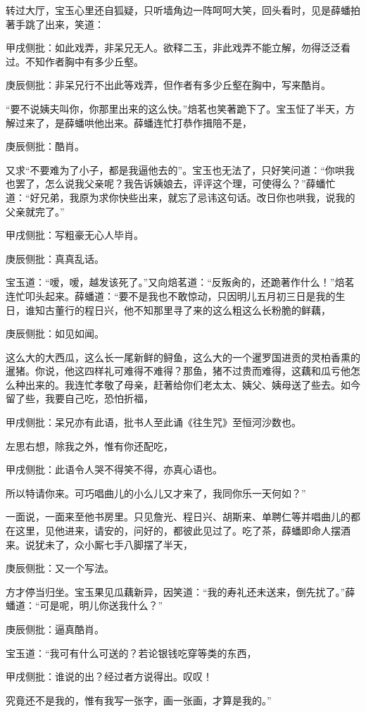 \begin{parag}
    转过大厅，宝玉心里还自狐疑，只听墙角边一阵呵呵大笑，回头看时，见是薛蟠拍著手跳了出来，笑道：\begin{note}甲戌侧批：如此戏弄，非呆兄无人。欲释二玉，非此戏弄不能立解，勿得泛泛看过。不知作者胸中有多少丘壑。\end{note}\begin{note}庚辰侧批：非呆兄行不出此等戏弄，但作者有多少丘壑在胸中，写来酷肖。\end{note}“要不说姨夫叫你，你那里出来的这么快。”焙茗也笑著跪下了。宝玉怔了半天，方解过来了，是薛蟠哄他出来。薛蟠连忙打恭作揖陪不是，\begin{note}庚辰侧批：酷肖。\end{note}又求“不要难为了小子，都是我逼他去的”。宝玉也无法了，只好笑问道：“你哄我也罢了，怎么说我父亲呢？我告诉姨娘去，评评这个理，可使得么？”薛蟠忙道：“好兄弟，我原为求你快些出来，就忘了忌讳这句话。改日你也哄我，说我的父亲就完了。”\begin{note}甲戌侧批：写粗豪无心人毕肖。\end{note}\begin{note}庚辰侧批：真真乱话。\end{note}宝玉道：“嗳，嗳，越发该死了。”又向焙茗道：“反叛肏的，还跪著作什么！”焙茗连忙叩头起来。薛蟠道：“要不是我也不敢惊动，只因明儿五月初三日是我的生日，谁知古董行的程日兴，他不知那里寻了来的这么粗这么长粉脆的鲜藕，\begin{note}庚辰侧批：如见如闻。\end{note}这么大的大西瓜，这么长一尾新鲜的鲟鱼，这么大的一个暹罗国进贡的灵柏香熏的暹猪。你说，他这四样礼可难得不难得？那鱼，猪不过贵而难得，这藕和瓜亏他怎么种出来的。我连忙孝敬了母亲，赶著给你们老太太、姨父、姨母送了些去。如今留了些，我要自己吃，恐怕折福，\begin{note}甲戌侧批：呆兄亦有此语，批书人至此诵《往生咒》至恒河沙数也。\end{note}左思右想，除我之外，惟有你还配吃，\begin{note}甲戌侧批：此语令人哭不得笑不得，亦真心语也。\end{note}所以特请你来。可巧唱曲儿的小么儿又才来了，我同你乐一天何如？”
\end{parag}


\begin{parag}
    一面说，一面来至他书房里。只见詹光、程日兴、胡斯来、单聘仁等并唱曲儿的都在这里，见他进来，请安的，问好的，都彼此见过了。吃了茶，薛蟠即命人摆酒来。说犹未了，众小厮七手八脚摆了半天，\begin{note}庚辰侧批：又一个写法。\end{note}方才停当归坐。宝玉果见瓜藕新异，因笑道：“我的寿礼还未送来，倒先扰了。”薛蟠道：“可是呢，明儿你送我什么？”\begin{note}庚辰侧批：逼真酷肖。\end{note}宝玉道：“我可有什么可送的？若论银钱吃穿等类的东西，\begin{note}甲戌侧批：谁说的出？经过者方说得出。叹叹！\end{note}究竟还不是我的，惟有我写一张字，画一张画，才算是我的。”
\end{parag}


